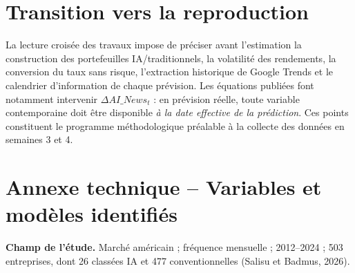 \documentclass[11pt,a4paper]{article}
\begin{document}
\section{Transition vers la reproduction}
La lecture croisée des travaux impose de préciser avant l'estimation la construction des portefeuilles IA/traditionnels, la volatilité des rendements, la conversion du taux sans risque, l'extraction historique de Google Trends et le calendrier d'information de chaque prévision. Les équations publiées font notamment intervenir $\Delta AI\_News_t$ : en prévision réelle, toute variable contemporaine doit être disponible \emph{à la date effective de la prédiction}. Ces points constituent le programme méthodologique préalable à la collecte des données en semaines 3 et 4.

\clearpage
\section*{Annexe technique -- Variables et modèles identifiés}
\textbf{Champ de l'étude.} Marché américain ; fréquence mensuelle ; 2012--2024 ; 503 entreprises, dont 26 classées IA et 477 conventionnelles (Salisu et Badmus, 2026).
\end{document}
